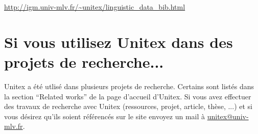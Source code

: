 \bigskip
\noindent \url{http://igm.univ-mlv.fr/~unitex/linguistic_data_bib.html}


\section*{Si vous utilisez Unitex dans des projets de recherche...}
Unitex a été utlisé dans plusieurs projets de recherche. Certains sont listés dans la section 
``Related works'' de la page d'accueil d'Unitex. Si vous avez effectuer des travaux de recherche
avec Unitex (ressources, projet, article, thèse, ...) et si vous désirez qu'ils soient référencés
sur le site envoyez un mail à \url{unitex@univ-mlv.fr}.


